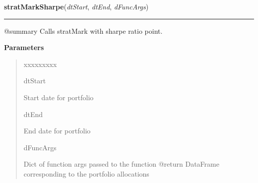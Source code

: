 \hspace{.8\funcindent}\begin{boxedminipage}{\funcwidth}

    \raggedright \textbf{stratMarkSharpe}(\textit{dtStart}, \textit{dtEnd}, \textit{dFuncArgs})

    \vspace{-1.5ex}

    \rule{\textwidth}{0.5\fboxrule}
\setlength{\parskip}{2ex}
    @summary Calls stratMark with sharpe ratio point.

\setlength{\parskip}{1ex}
      \textbf{Parameters}
      \vspace{-1ex}

      \begin{quote}
        \begin{Ventry}{xxxxxxxxx}

          \item[dtStart]

          Start date for portfolio

          \item[dtEnd]

          End date for portfolio

          \item[dFuncArgs]

          Dict of function args passed to the function @return DataFrame 
          corresponding to the portfolio allocations

        \end{Ventry}

      \end{quote}

    \end{boxedminipage}

    \label{QSTK:qstkstrat:strategies:stratMarkLowVar}

    \vspace{0.5ex}

